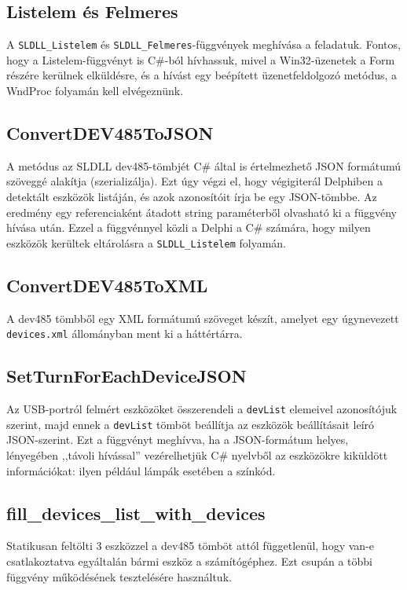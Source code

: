 \documentclass[tocnopagenum]{thesis-ekf}
\theoremstyle{definition}
\theoremstyle{remark}
\begin{document}
	\subsection{Listelem és Felmeres} A \verb*|SLDLL_Listelem| és \verb*|SLDLL_Felmeres|-függvények meghívása a feladatuk. Fontos, hogy a Listelem-függvényt is C\#-ból hívhassuk, mivel a Win32-üzenetek a Form részére kerülnek elküldésre, és a hívást egy beépített üzenetfeldolgozó metódus, a WndProc folyamán kell elvégeznünk.

	\subsection{ConvertDEV485ToJSON}
	A metódus az SLDLL dev485-tömbjét C\# által is értelmezhető JSON formátumú szöveggé alakítja (szerializálja). Ezt úgy végzi el, hogy végigiterál Delphiben a detektált eszközök listáján, és azok azonosítóit írja be egy JSON-tömbbe. Az eredmény egy referenciaként átadott string paraméterből olvasható ki a függvény hívása után. Ezzel a függvénnyel közli a Delphi a C\# számára, hogy milyen eszközök kerültek eltárolásra a \verb*|SLDLL_Listelem| folyamán.

	\subsection{ConvertDEV485ToXML} 
	A dev485 tömbből egy XML formátumú szöveget készít, amelyet egy úgynevezett \verb*|devices.xml| állományban ment ki a háttértárra.

	\subsection{SetTurnForEachDeviceJSON} 
	Az USB-portról felmért eszközöket összerendeli a \verb*|devList| elemeivel azonosítójuk szerint, majd ennek a \verb*|devList| tömböt beállítja az eszközök beállításait leíró JSON-szerint. Ezt a függvényt meghívva, ha a JSON-formátum helyes, lényegében ,,távoli hívással'' vezérelhetjük C\# nyelvből az eszközökre kiküldött információkat: ilyen például lámpák esetében a színkód.
	\subsection{fill\_devices\_list\_with\_devices} Statikusan feltölti 3 eszközzel a dev485 tömböt attól függetlenül, hogy van-e csatlakoztatva egyáltalán bármi eszköz a számítógéphez. Ezt csupán a többi függvény működésének tesztelésére használtuk.
	
\end{document}
